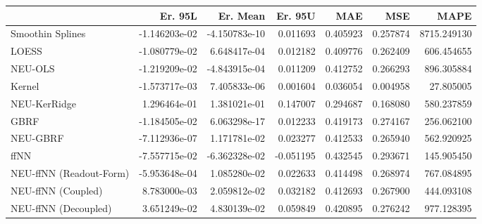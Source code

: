 \begin{tabular}{lrrrrrr}
\toprule
{} &       Er. 95L &      Er. Mean &   Er. 95U &       MAE &       MSE &         MAPE \\
\midrule
Smoothin Splines        & -1.146203e-02 & -4.150783e-10 &  0.011693 &  0.405923 &  0.257874 &  8715.249130 \\
LOESS                   & -1.080779e-02 &  6.648417e-04 &  0.012182 &  0.409776 &  0.262409 &   606.454655 \\
NEU-OLS                 & -1.219209e-02 & -4.843915e-04 &  0.011209 &  0.412752 &  0.266293 &   896.305884 \\
Kernel                  & -1.573717e-03 &  7.405833e-06 &  0.001604 &  0.036054 &  0.004958 &    27.805005 \\
NEU-KerRidge            &  1.296464e-01 &  1.381021e-01 &  0.147007 &  0.294687 &  0.168080 &   580.237859 \\
GBRF                    & -1.184505e-02 &  6.063298e-17 &  0.012233 &  0.419173 &  0.274167 &   256.062100 \\
NEU-GBRF                & -7.112936e-07 &  1.171781e-02 &  0.023277 &  0.412533 &  0.265940 &   562.920925 \\
ffNN                    & -7.557715e-02 & -6.362328e-02 & -0.051195 &  0.432545 &  0.293671 &   145.905450 \\
NEU-ffNN (Readout-Form) & -5.953648e-04 &  1.085280e-02 &  0.022633 &  0.414498 &  0.268974 &   767.084895 \\
NEU-ffNN (Coupled)      &  8.783000e-03 &  2.059812e-02 &  0.032182 &  0.412693 &  0.267900 &   444.093108 \\
NEU-ffNN (Decoupled)    &  3.651249e-02 &  4.830139e-02 &  0.059849 &  0.420895 &  0.276242 &   977.128395 \\
\bottomrule
\end{tabular}
